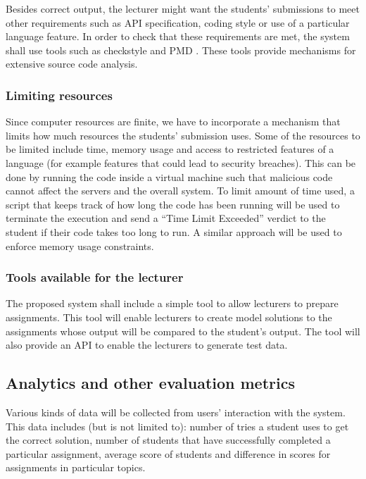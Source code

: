 \documentclass[12pt]{article}
\begin{document}
		Besides correct output, the lecturer might want the students' submissions to meet other requirements such as API specification, coding style or use of a particular language feature. In order to check that these requirements are met, the system shall use tools such as checkstyle \cite{checkstyle} and PMD \cite{pmd}. These tools provide mechanisms for extensive source code analysis.
		\subsubsection{Limiting resources}
		Since computer resources are finite, we have to incorporate a mechanism that limits how much resources the students' submission uses. Some of the resources to be limited include time, memory usage and access to restricted features of a language (for example features that could lead to security breaches). This can be done by running the code inside a virtual machine such that malicious code cannot affect the servers and the overall system. To limit amount of time used, a script that keeps track of how long the code has been running will be used to terminate the execution and send a “Time Limit Exceeded” verdict to the student if their code takes too long to run. A similar approach will be used to enforce memory usage constraints.
		\subsubsection{Tools available for the lecturer}
		The proposed system shall include a simple tool to allow lecturers to prepare assignments. This tool will enable lecturers to create model solutions to the assignments whose output will be compared to the student’s output. The tool will also provide an API to enable the lecturers to generate test data.
	\subsection{Analytics and other evaluation metrics}
	Various kinds of data will be collected from users' interaction with the system. This data includes (but is not limited to): number of tries a student uses to get the correct solution, number of students that have successfully completed a particular assignment, average score of students and difference in scores for assignments in particular topics.
	
\end{document}

